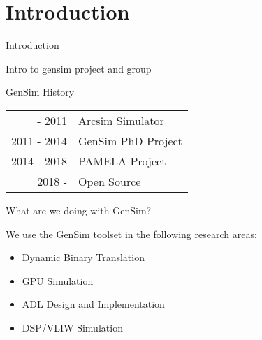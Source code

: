 
\section{Introduction}

\begin{frame}[t]{Introduction}

Intro to gensim project and group

\end{frame}

\begin{frame}{GenSim History}


\centering
\begin{tabular}{r l}
\phantom{0000} - 2011 & Arcsim Simulator \\
2011 - 2014 & GenSim PhD Project \\
2014 - 2018 & PAMELA Project \\
2018 - \phantom{0000}        & Open Source
\end{tabular}

\end{frame}

\begin{frame}{What are we doing with GenSim?}

We use the GenSim toolset in the following research areas:

\begin{itemize}
\item Dynamic Binary Translation
\item GPU Simulation
\item ADL Design and Implementation
\item DSP/VLIW Simulation
\end{itemize}

\end{frame}

